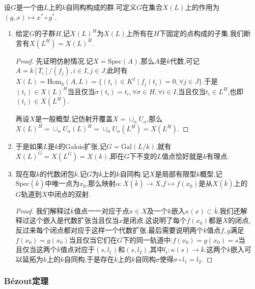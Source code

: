 设$G$是一个由$L$上的$k$自同构构成的群.可定义$G$在集合$X(L)$上的作用为$(g,x)\mapsto x^*\circ g^*$.
\begin{enumerate}
	\item 给定$G$的子群$H$,记$X(L)^H$为$X(L)$上所有在$H$下固定的点构成的子集.我们断言有$X(L^H)=X(L)^H$.
	\begin{proof}
		
		先证明仿射情况,记$X=\mathrm{Spec}(A)$,那么$A$是$k$代数,可记$A=k[T_i]/(f_j),i\in I,j\in J$.此时有$X(L)=\mathrm{Hom}_k(A,L)=\{(t_i)\in K^I\mid f_j(t_i)=0,\forall j\in J\}$.于是$(t_i)\in X(L)^H$当且仅当$\sigma(t_i)=t_i,\forall\sigma\in H,\forall i\in I$,当且仅当$t_i\in L^H$,也即$(t_i)\in X(L^H)$.
		
		再设$X$是一般概型,记仿射开覆盖$X=\cup_{\alpha}U_{\alpha}$,那么$X(L)^H=\cup_{\alpha}U_{\alpha}(L)^H=\cup_{\alpha}U_{\alpha}(L^H)=X(L^H)$.
	\end{proof}
	\item 于是如果$L$是$k$的Galois扩张,记$G=\mathrm{Gal}(L/k)$,就有$X(L)^G=X(L^G)=X(k)$,即在$G$下不变的$L$值点恰好就是$k$有理点.
	\item 现在取$k$的代数闭包$\overline{k}$.记$G$为$\overline{k}$上的$k$自同构.记$X$是局部有限型$k$概型,记$\mathrm{Spec}(\overline{k})$中唯一点为$x_0$,那么映射$\alpha:X(\overline{k})\to X$,$f\mapsto f(x_0)$是从$X(\overline{k})$上的$G$轨道到$X$中闭点的双射.
	\begin{proof}
		
		我们解释过$\overline{k}$值点一一对应于点$x\in X$及一个$k$嵌入$\kappa(x)\subset\overline{k}$.我们还解释过这个嵌入是代数扩张当且仅当$x$是闭点.这说明了每个$f(x_0)$都是$X$的闭点,反过来每个闭点都对应于这样一个代数扩张.最后需要说明两个$\overline{k}$值点$f,g$满足$f(x_0)=g(x_0)$当且仅当它们在$G$下的同一轨道中:$f(x_0)=g(x_0)=s$当且仅当这两个$\overline{k}$值点对应于$(s,l_1)$和$(s,l_2)$,其中$l_i:\kappa(s)\to\overline{k}$.这两个$k$嵌入可以延拓为$\overline{k}$上的$k$自同构,于是存在$\overline{k}$上的$k$自同构$\sigma$使得$\sigma\circ l_1=l_2$.
	\end{proof}
\end{enumerate}


\subsubsection{B\'ezout定理}

